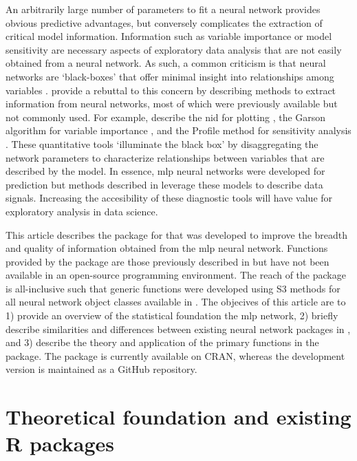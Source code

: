 \documentclass[article,shortnames]{jss}\usepackage[]{graphicx}\usepackage[]{color}
\begin{document}
An arbitrarily large number of parameters to fit a neural network provides obvious predictive advantages, but conversely complicates the extraction of critical model information.  Information such as variable importance or model sensitivity are necessary aspects of exploratory data analysis that are not easily obtained from a neural network. As such, a common criticism is that neural networks are `black-boxes' that offer minimal insight into relationships among variables \citep[e.g.,][]{Paruelo97}.  \citet{Olden02} provide a rebuttal to this concern by describing methods to extract information from neural networks, most of which were previously available but not commonly used.  For example, \citet{Olden02} describe  the \ac{nid} for plotting \citep{Ozesmi99}, the Garson algorithm for variable importance \citep{Garson91}, and the Profile method for sensitivity analysis \citep{Lek96}.  These quantitative tools `illuminate the black box' by disaggregating the network parameters to characterize relationships between variables that are described by the model.  In essence, \ac{mlp} neural networks were developed for prediction but methods described in \citep{Olden02} leverage these models to describe data signals.  Increasing the accesibility of these diagnostic tools will have value for exploratory analysis in data science.

This article describes the  package for  that was developed to improve the breadth and quality of information obtained from the \ac{mlp} neural network.  Functions provided by the package are those previously described in \citep{Olden02} but have not been available in an open-source programming environment.  The reach of the package is all-inclusive such that generic functions were developed using S3 methods for all neural network object classes available in .  The objecives of this article are to 1) provide an overview of the statistical foundation the \ac{mlp} network, 2) briefly describe similarities and differences between existing neural network packages in , and 3) describe the theory and application of the primary functions in the  package.  The package is currently available on CRAN, whereas the development version is maintained as a GitHub repository.  

\section[Theoretical foundation]{Theoretical foundation and existing R packages}
\end{document}

